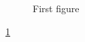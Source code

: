\documentclass{report}
\begin{document}
\begin{figure}[ht]
\caption{First figure}\label{fig:1}
\end{figure}
\cref{fig:1}
\end{document}
